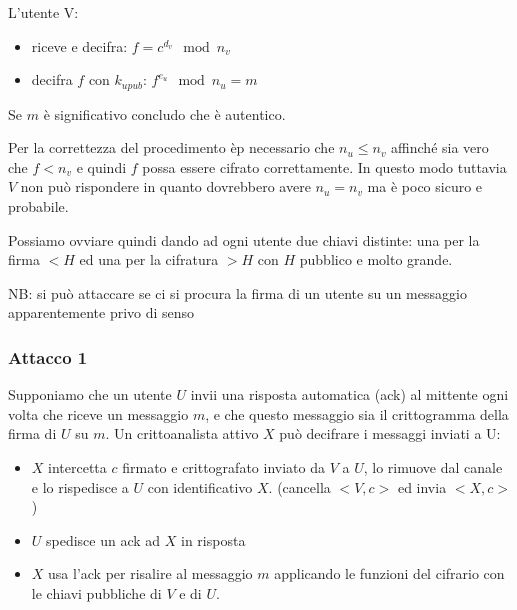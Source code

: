 L'utente V:
\begin{itemize}
    \item riceve e decifra: $f = c^{d_v} \mod n_v$
    \item decifra $f$ con $k_{upub}$: $f^{e_u} \mod n_u = m$
\end{itemize}

Se $m$ è significativo concludo che è autentico.

Per la correttezza del procedimento èp necessario che $n_u \leq n_v$ affinché sia vero che $f < n_v$ e quindi $f$ possa essere cifrato correttamente.
In questo modo tuttavia $V$ non può rispondere in quanto dovrebbero avere $n_u = n_v$ ma è poco sicuro e probabile.

Possiamo ovviare quindi dando ad ogni utente due chiavi distinte: una per la firma $< H$ ed una per la cifratura $> H$ con $H$ pubblico e molto grande.

NB: si può attaccare se ci si procura la firma di un utente su un messaggio apparentemente privo di senso

\subsubsection{Attacco 1}
Supponiamo che un utente $U$ invii una risposta automatica (ack) al mittente ogni volta che riceve un messaggio $m$, e che questo messaggio sia il crittogramma della firma di $U$ su $m$.
Un crittoanalista attivo $X$ può decifrare i messaggi inviati a U:
\begin{itemize}
    \item $X$ intercetta $c$ firmato e crittografato inviato da $V$ a $U$, lo rimuove dal canale e lo rispedisce a $U$ con identificativo $X$. (cancella $<V,c>$ ed invia $<X,c>$)
    \item $U$ spedisce un ack ad $X$ in risposta
    \item $X$ usa l'ack per risalire al messaggio $m$ applicando le funzioni del cifrario con le chiavi pubbliche di $V$ e di $U$.
\end{itemize}

